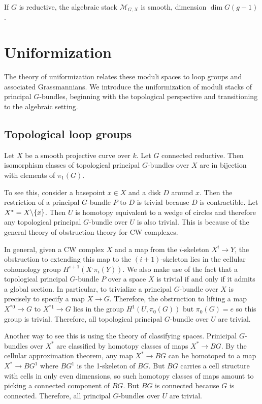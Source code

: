 \documentclass[12pt]{article}
\begin{document}
\begin{proposition}
    If $G$ is reductive, the algebraic stack $\mathcal{M}_{G,X}$ is smooth, dimension $\dim G(g-1)$.
\end{proposition}

\section{Uniformization}
The theory of uniformization relates these moduli spaces to loop groups and associated Grassmannians. We introduce the uniformization of moduli stacks of principal $G$-bundles, beginning with the topological perspective and transitioning to the algebraic setting. 
\subsection{Topological loop groups}
Let $X$ be a smooth projective curve over $k$. Let $G$ connected reductive. Then isomorphism classes of topological principal $G$-bundles over $X$ are in bijection with elements of $\pi_1(G)$.

To see this, consider a basepoint $x\in X$ and a disk $D$ around $x$. Then the restriction of a principal $G$-bundle $P$ to $D$ is trivial because $D$ is contractible. Let $X^* = X \backslash \{x\}$. Then $U$ is homotopy equivalent to a wedge of circles and therefore any topological principal $G$-bundle over $U$ is also trivial. This is because of the general theory of obstruction theory for CW complexes.

In general, given a CW complex $X$ and a map from the $i$-skeleton $X^i \to Y$, the obstruction to extending this map to the $(i+1)$-skeleton lies in the cellular cohomology group $H^{i+1}(X^, \pi_i(Y))$. We also make use of the fact that a topological principal $G$-bundle $P$ over a space $X$ is trivial if and only if it admits a global section. In particular, to trivialize a principal $G$-bundle over $X$ is precisely to specify a map $X \to G$. Therefore, the obstruction to lifting a map $X^{*0} \to G$ to $X^{*1} \to G$ lies in the group $H^1(U, \pi_0(G))$ but $\pi_0(G) = e$ so this group is trivial. Therefore, all topological principal $G$-bundle over $U$ are trivial.

Another way to see this is using the theory of classifying spaces. Prinicipal $G$-bundles over $X^*$ are classified by homotopy classes of maps $X^* \to BG$. By the cellular approximation theorem, any map $X^* \to BG$ can be homotoped to a map $X^* \to BG^1$ where $BG^1$ is the 1-skeleton of $BG$. But $BG$ carries a cell structure with cells in only even dimensions, so such homotopy classes of maps amount to picking a connected component of $BG$. But $BG$ is connected because $G$ is connected. Therefore, all principal $G$-bundles over $U$ are trivial.
\end{document}
